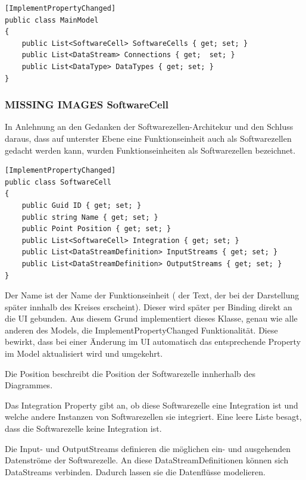\documentclass[11pt]{article}
\begin{document}
\begin{verbatim}
[ImplementPropertyChanged]
public class MainModel
{
    public List<SoftwareCell> SoftwareCells { get; set; }
    public List<DataStream> Connections { get;  set; }
    public List<DataType> DataTypes { get; set; } 
}
\end{verbatim}

\subsubsection{{\bfseries\sffamily MISSING IMAGES} SoftwareCell}
\label{sec:orgheadline8}
In Anlehnung an den Gedanken der Softwarezellen-Architekur und den Schluss
daraus, dass auf unterster Ebene eine Funktionseinheit auch als
Softwarezellen gedacht werden kann, wurden Funktionseinheiten als
Softwarezellen bezeichnet.

\begin{verbatim}
[ImplementPropertyChanged]
public class SoftwareCell
{
    public Guid ID { get; set; }
    public string Name { get; set; }
    public Point Position { get; set; }
    public List<SoftwareCell> Integration { get; set; }
    public List<DataStreamDefinition> InputStreams { get; set; }
    public List<DataStreamDefinition> OutputStreams { get; set; }
}
\end{verbatim}

Der Name ist der Name der Funktionseinheit ( der Text, der bei der
Darstellung später innhalb des Kreises erscheint). Dieser wird später per Binding
direkt an die UI gebunden. Aus diesem Grund implementiert dieses Klasse,
genau wie alle anderen des Models, die ImplementPropertyChanged
Funktionalität. Diese bewirkt, dass bei einer Änderung im UI automatisch das
entsprechende Property im Model aktualisiert wird und umgekehrt.

Die Position beschreibt die Position der Softwarezelle innherhalb des
Diagrammes.  

Das Integration Property gibt an, ob diese Softwarezelle eine Integration
ist und welche andere Instanzen von Softwarezellen sie integriert.
Eine leere Liste besagt, dass die Softwarezelle keine Integration ist.

Die Input- und OutputStreams definieren die möglichen ein- und ausgehenden
Datenströme der Softwarezelle. An diese DataStreamDefinitionen können sich DataStreams
verbinden. Dadurch lassen sie die Datenflüsse modelieren.
\end{document}
